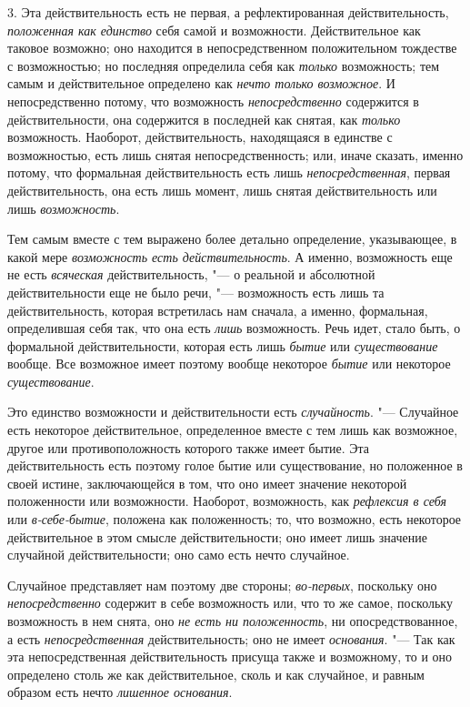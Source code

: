 3. Эта действительность есть не первая, а рефлектированная действительность,
{\em положенная как единство} себя самой и возможности.
Действительное как таковое возможно; оно находится в непосредственном
положительном тождестве с возможностью; но последняя определила себя как
{\em только} возможность; тем самым и действительное
определено как {\em нечто только возможное}. И
непосредственно потому, что возможность
{\em непосредственно} содержится в действительности,
она содержится в последней как снятая, как {\em только}
возможность. Наоборот, действительность, находящаяся в единстве с
возможностью, есть лишь снятая непосредственность; или, иначе сказать,
именно потому, что формальная действительность есть лишь
{\em непосредственная}, первая действительность, она
есть лишь момент, лишь снятая действительность или лишь
{\em возможность}.

Тем самым вместе с тем выражено более детально определение, указывающее, в
какой мере {\em возможность есть действительность}. А
именно, возможность еще не есть {\em всяческая}
действительность, "--- о реальной и абсолютной действительности еще не было
речи, "--- возможность есть лишь та действительность, которая встретилась нам
сначала, а именно, формальная, определившая себя так, что она есть
{\em лишь} возможность. Речь идет, стало быть, о
формальной действительности, которая есть лишь
{\em бытие} или {\em существование}
вообще. Все возможное имеет поэтому вообще некоторое
{\em бытие} или некоторое
{\em существование}.

Это единство возможности и действительности есть
{\em случайность}. "--- Случайное есть некоторое
действительное, определенное вместе с тем лишь как возможное, другое или
противоположность которого также имеет бытие. Эта действительность есть
поэтому голое бытие или существование, но положенное в своей истине,
заключающейся в том, что оно имеет значение некоторой положенности или
возможности. Наоборот, возможность, как {\em рефлексия
в себя} или {\em в-себе-бытие}, положена как
положенность; то, что возможно, есть некоторое действительное в этом смысле
действительности; оно имеет лишь значение случайной действительности; оно
само есть нечто случайное.

Случайное представляет нам поэтому две стороны;
{\em во-первых}, поскольку оно
{\em непосредственно} содержит в себе возможность или,
что то же самое, поскольку возможность в нем снята, оно
{\em не есть ни положенность}, ни опосредствованное, а
есть {\em непосредственная} действительность; оно не
имеет {\em основания}. "--- Так как эта непосредственная
действительность присуща также и возможному, то и оно определено столь же
как действительное, сколь и как случайное, и равным образом есть нечто
{\em лишенное основания}.

